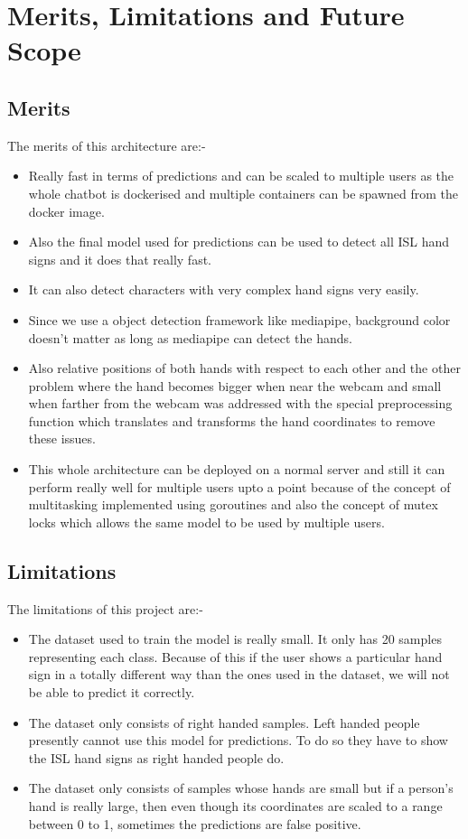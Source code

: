 \documentclass[12pt,a4paper]{report}
\begin{document}
\chapter{Merits, Limitations and Future Scope}

\section{Merits}
The merits of this architecture are:-
\begin{itemize}
	\item Really fast in terms of predictions and can be scaled to multiple users as the whole chatbot is dockerised and multiple containers can be spawned from the docker image.
	\item Also the final model used for predictions can be used to detect all ISL hand signs and it does that really fast.
	\item It can also detect characters with very complex hand signs very easily.
	\item Since we use a object detection framework like mediapipe, background color doesn't matter as long as mediapipe can detect the hands.
	\item Also relative positions of both hands with respect to each other and the other problem where the hand becomes bigger when near the webcam and small when farther from the webcam was addressed with the special preprocessing function which translates and transforms the hand coordinates to remove these issues.
	\item This whole architecture can be deployed on a normal server and still it can perform really well for multiple users upto a point because of the concept of multitasking implemented using goroutines and also the concept of mutex locks which allows the same model to be used by multiple users.
\end{itemize}

\section{Limitations}
The limitations of this project are:-
\begin{itemize}
	\item The dataset used to train the model is really small. It only has 20 samples representing each class. Because of this if the user shows a particular hand sign in a totally different way than the ones used in the dataset, we will not be able to predict it correctly.
	\item The dataset only consists of right handed samples. Left handed people presently cannot use this model for predictions. To do so they have to show the ISL hand signs as right handed people do.
	\item The dataset only consists of samples whose hands are small but if a person's hand is really large, then even though its coordinates are scaled to a range between 0 to 1, sometimes the predictions are false positive.
\end{itemize}
\end{document}
